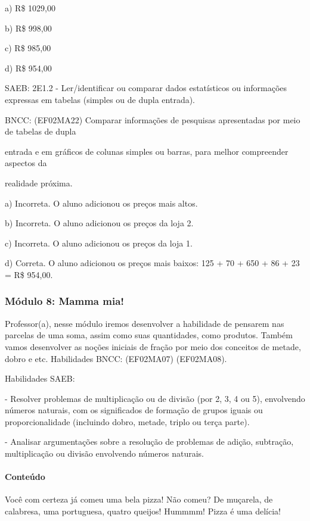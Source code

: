 a) R\$ 1029,00

b) R\$ 998,00

c) R\$ 985,00

d) R\$ 954,00

SAEB: 2E1.2 - Ler/identificar ou comparar dados estatísticos ou
informações expressas em tabelas (simples ou de dupla entrada).

BNCC: (EF02MA22) Comparar informações de pesquisas apresentadas por meio
de tabelas de dupla

entrada e em gráficos de colunas simples ou barras, para melhor
compreender aspectos da

realidade próxima.

a) Incorreta. O aluno adicionou os preços mais altos.

b) Incorreta. O aluno adicionou os preços da loja 2.

c) Incorreta. O aluno adicionou os preços da loja 1.

d) Correta. O aluno adicionou os preços mais baixos: 125 + 70 + 650 + 86
+ 23 = R\$ 954,00.

\subsubsection{Módulo 8: Mamma mia!}\label{muxf3dulo-8-mamma-mia}

Professor(a), nesse módulo iremos desenvolver a habilidade de pensarem
nas parcelas de uma soma, assim como suas quantidades, como produtos.
Também vamos desenvolver as noções iniciais de fração por meio dos
conceitos de metade, dobro e etc. Habilidades BNCC: (EF02MA07)
(EF02MA08).

Habilidades SAEB:

- Resolver problemas de multiplicação ou de divisão (por 2, 3, 4 ou 5),
envolvendo números naturais, com os significados de formação de grupos
iguais ou proporcionalidade (incluindo dobro, metade, triplo ou terça
parte).

- Analisar argumentações sobre a resolução de problemas de adição,
subtração, multiplicação ou divisão envolvendo números naturais.

\paragraph{Conteúdo}\label{conteuxfado-7}

Você com certeza já comeu uma bela pizza! Não comeu? De muçarela, de
calabresa, uma portuguesa, quatro queijos! Hummmm! Pizza é uma delícia!

